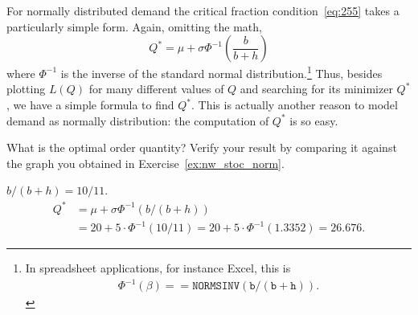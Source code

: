 For normally distributed demand the critical fraction condition~\eqref{eq:255} takes a particularly simple form. Again, omitting the math,
\begin{equation}\label{eq:412}
Q^* = \mu + \sigma \Phi^{-1}\left(\frac b{b+h}\right) 
\end{equation}
where $\Phi^{-1}$ is the inverse of the standard normal distribution.\footnote{In  spreadsheet applications,  for instance Excel, this is 
\begin{align*}
\Phi^{-1}(\beta)=\mathtt{=NORMSINV(b/(b+h))}.
\end{align*}
}
Thus, besides plotting $L(Q)$ for many different values of $Q$ and searching for its minimizer $Q^*$, we have a simple formula to find $Q^*$. This is actually another reason to model demand as normally distribution: the computation of $Q^*$ is so easy.



\begin{exercise}[Continuation with $\sigma=5$]
What is the optimal order quantity? Verify your result by comparing it against the graph you obtained in Exercise~\ref{ex:nw_stoc_norm}. 



\begin{solution}
$b/(b+h)=10/11$. 
\begin{align*}
Q^* 
& = \mu + \sigma \Phi^{-1}(b/(b+h)) \\
& = 20 + 5\cdot \Phi^{-1}(10/11) = 20 + 5\cdot \Phi^{-1}(1.3352) = 26.676.
\end{align*}
\end{solution}
\end{exercise}


